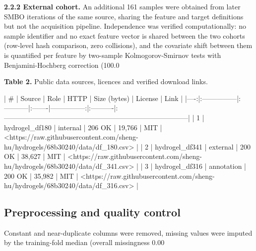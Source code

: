 \documentclass[utf8]{FrontiersinHarvard}
\begin{document}
\textbf{2.2.2 External cohort.} An additional 161 samples were obtained from later SMBO iterations of the same source, sharing the feature and target definitions but not the acquisition pipeline. Independence was verified computationally: no sample identifier and no exact feature vector is shared between the two cohorts (row-level hash comparison, zero collisions), and the covariate shift between them is quantified per feature by two-sample Kolmogorov-Smirnov tests with Benjamini-Hochberg correction (100.0%

\textbf{Table 2.} Public data sources, licences and verified download links.

|   # | Source         | Role       | HTTP   |   Size (bytes) | License   | Link                                                                            |
|----:|:---------------|:-----------|:-------|---------------:|:----------|:--------------------------------------------------------------------------------|
|   1 | hydrogel_df180 | internal   | 206 OK |         19,766 | MIT       | <https://raw.githubusercontent.com/sheng-hu/hydrogels/68b30240/data/df_180.csv> |
|   2 | hydrogel_df341 | external   | 200 OK |         38,627 | MIT       | <https://raw.githubusercontent.com/sheng-hu/hydrogels/68b30240/data/df_341.csv> |
|   3 | hydrogel_df316 | annotation | 200 OK |         35,982 | MIT       | <https://raw.githubusercontent.com/sheng-hu/hydrogels/68b30240/data/df_316.csv> |


\subsection{Preprocessing and quality control}

Constant and near-duplicate columns were removed, missing values were imputed by the training-fold median (overall missingness 0.00%
\end{document}
